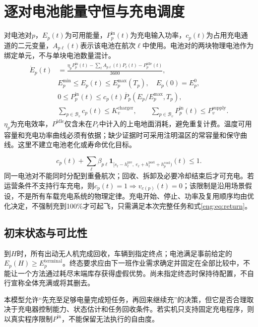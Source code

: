 \section{逐对电池能量守恒与充电调度}
\noindent 对电池对$p$，$E_p(t)$为可用能量，$P_p^{\mathrm{in}}(t)$为充电输入功率，$c_p(t)$为占用充电通道的二元变量，$A_{p\ell}(t)$表示该电池在航次$\ell$中使用。电池对的两块物理电池作为绑定单元，不与单块电池数量混计。
\begin{align}
 \dot E_p(t)&=\frac{\eta_pP_p^{\mathrm{in}}(t)
 -\sum_\ell A_{p\ell}(t)P_\ell(t)-P_p^{\mathrm{idle}}(t)}{3600},\\
 &E_p^{\min}\le E_p(t)\le E_p^{\max}(T_p),\quad E_p(0)=E_p^0,\\
 &0\le P_p^{\mathrm{in}}(t)\le c_p(t)\overline P_p(E_p/E_p^{\max},T_p),\\
 &\sum_{p\in\mathcal B_v}c_p(t)\le K_v^{\mathrm{charger}},\qquad
 \sum_{p\in\mathcal B_v}P_p^{\mathrm{in}}(t)\le P_v^{\mathrm{supply}}.
 \label{eng:eq:battery}
\end{align}
\noindent $\eta_p$为充电效率，$P^{\mathrm{idle}}$仅含未在$P_\ell$中计入的上电地面消耗，避免重复计费。温度可用容量和充电功率曲线必须有依据；缺少证据时可采用注明温区的常容量和保守曲线。这里不建立电池老化或寿命优化目标。

\begin{equation}
 c_p(t)+\sum_\ell\beta_{p\ell}
 \mathbf1_{[s_\ell-h_\ell^{\mathrm{pre}},\ e_\ell+h_\ell^{\mathrm{post}}+h_p^{\mathrm{cool}})}(t)\le1.
 \label{eng:eq:batteryavailability}
\end{equation}
\noindent 同一电池对不能同时分配到重叠航次；回收、拆卸及必要冷却结束后才可充电。若运营条件不支持行车充电，则$c_p(t)=1\Rightarrow v_{c(p)}(t)=0$；该限制是沿用场景假设，不是所有车载充电系统的物理定律。充电开始、停止、功率及复用顺序均由优化决定，不强制充到100\%才可起飞，只需满足本次完整任务和式\eqref{eng:eq:return}。

\subsection{初末状态与可比性}
\noindent 到$H$时，所有出动无人机完成回收，车辆到指定终点；电池满足事前给定的$E_p(H)\ge E_p^{\mathrm{terminal}}$。终态要求应由下一班作业需求确定并固定在全部比较中，不能让一个方法通过耗尽末端库存获得虚假优势。尚未指定终态时保持待配置，不自行宣称全体充满或将其删去。

\noindent 本模型允许“先充至足够电量完成短任务，再回来继续充”的决策，但它是否合理取决于充电器控制能力、状态估计和任务回收条件。若实机只支持固定充电程序，则以真实程序限制$P^{\mathrm{in}}$，不能保留无法执行的自由度。

